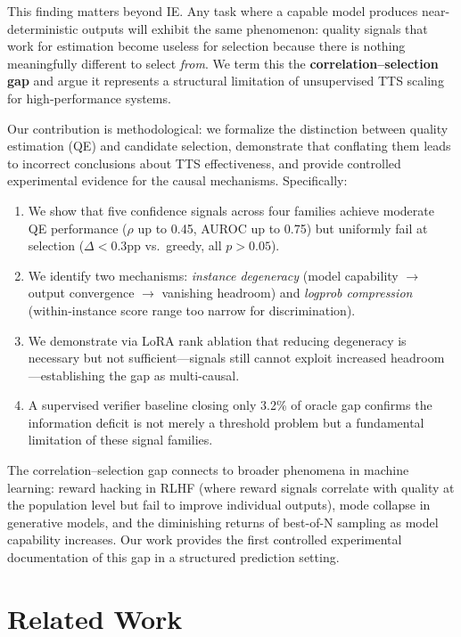 \documentclass[11pt]{article}
\begin{document}
This finding matters beyond IE. Any task where a capable model produces near-deterministic outputs will exhibit the same phenomenon: quality signals that work for estimation become useless for selection because there is nothing meaningfully different to select \emph{from}. We term this the \textbf{correlation--selection gap} and argue it represents a structural limitation of unsupervised TTS scaling for high-performance systems.

Our contribution is methodological: we formalize the distinction between quality estimation (QE) and candidate selection, demonstrate that conflating them leads to incorrect conclusions about TTS effectiveness, and provide controlled experimental evidence for the causal mechanisms. Specifically:

\begin{enumerate}
\item We show that five confidence signals across four families achieve moderate QE performance ($\rho$ up to 0.45, AUROC up to 0.75) but uniformly fail at selection ($\Delta < 0.3$pp vs.\ greedy, all $p > 0.05$).
\item We identify two mechanisms: \emph{instance degeneracy} (model capability $\rightarrow$ output convergence $\rightarrow$ vanishing headroom) and \emph{logprob compression} (within-instance score range too narrow for discrimination).
\item We demonstrate via LoRA rank ablation that reducing degeneracy is necessary but not sufficient---signals still cannot exploit increased headroom---establishing the gap as multi-causal.
\item A supervised verifier baseline closing only 3.2\% of oracle gap confirms the information deficit is not merely a threshold problem but a fundamental limitation of these signal families.
\end{enumerate}

The correlation--selection gap connects to broader phenomena in machine learning: reward hacking in RLHF (where reward signals correlate with quality at the population level but fail to improve individual outputs), mode collapse in generative models, and the diminishing returns of best-of-N sampling as model capability increases. Our work provides the first controlled experimental documentation of this gap in a structured prediction setting.

\section{Related Work}
\end{document}
